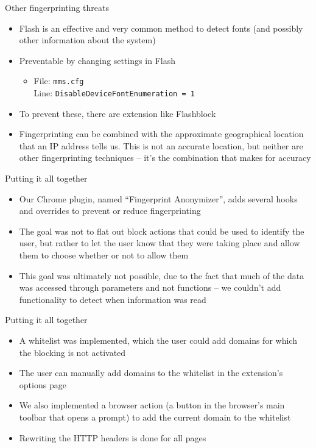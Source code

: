 \begin{frame}[fragile,t]{Other fingerprinting threats}
	\begin{itemize}
		\item Flash is an effective and very common method to detect fonts (and possibly other information about the system)
		\item Preventable by changing settings in Flash
		\begin{itemize}
			\item File: \texttt{mms.cfg} \\ Line: \texttt{DisableDeviceFontEnumeration = 1}
		\end{itemize}
		\item To prevent these, there are extension like Flashblock
		\item Fingerprinting can be combined with the approximate geographical location that an IP address tells us. This is not an accurate location, but neither are other fingerprinting techniques -- it's the combination that makes for accuracy
	\end{itemize}
\end{frame}

\begin{frame}[fragile,t]{Putting it all together}
	\begin{itemize}
		\item Our Chrome plugin, named ``Fingerprint Anonymizer'', adds several hooks and overrides to prevent or reduce fingerprinting
		\item The goal was not to flat out block actions that could be used to identify the user, but rather to let the user know that they were taking place and allow them to choose whether or not to allow them
		\item This goal was ultimately not possible, due to the fact that much of the data was accessed through parameters and not functions -- we couldn't add functionality to detect when information was read
	\end{itemize}
\end{frame}

\begin{frame}[fragile,t]{Putting it all together}
	\begin{itemize}
		\item A whitelist was implemented, which the user could add domains for which the blocking is not activated
		\item The user can manually add domains to the whitelist in the extension's options page
		\item We also implemented a browser action (a button in the browser's main toolbar that opens a prompt) to add the current domain to the whitelist
		\item Rewriting the HTTP headers is done for all pages
	\end{itemize}
\end{frame}

